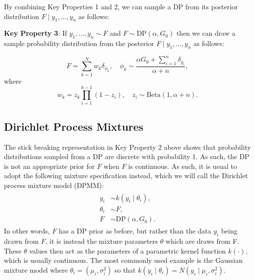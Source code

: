 \documentclass[nojss]{jss}
\begin{document}
By combining Key Properties 1 and 2, we can sample a DP from its posterior distribution $F \mid y_1,\ldots,y_n$ as follows:

\begin{tcolorbox}

\textbf{Key Property 3}:  If $y_1,\ldots,y_n \sim F$ and $F \sim \text{DP} (\alpha, G_0)$ then we can draw a sample probability distribution from the posterior $F\mid y_1,\ldots,y_n$ as follows:

$$F = \sum_{k=1}^N w_k \delta_{\phi_k}, \quad \phi_k \sim \frac{\alpha G_0 + \sum_{i=1}^n \delta_{y_i}}{\alpha+n},$$
where
$$w_k = z_k \prod_{i=1}^{k-1} (1-z_i),\quad z_i \sim \text{Beta}(1,\alpha+n).$$

\end{tcolorbox}




\subsection{Dirichlet Process Mixtures} \label{subsec:dpm}
The stick breaking representation in Key Property 2 above shows that  probability distributions sampled from a DP are discrete with probability 1. As such, the DP is not an appropriate prior for $F$ when $F$ is continuous. As such, it is usual to adopt the following mixture specification instead, which we will call the Dirichlet process mixture model (DPMM):
\begin{align}
\begin{split}
y_i &\sim k(y_i \mid \theta_i), \\
\theta_i &\sim F, \\
F &\sim \text{DP} (\alpha, G_0).
\end{split}
\label{eqn:dpmm}
\end{align}
In other words, $F$ has a DP prior as before, but rather than the data $y_i$ being drawn from $F$, it is instead the mixture parameters $\theta$ which are draws from F.  These $\theta$ values then act as the parameters of a parametric kernel function $k(\cdot)$, which is usually continuous. The most commonly used example is the Gaussian mixture model where $\theta_i = (\mu_i,\sigma^2_i)$ so that $k(y_i \mid \theta_i) = N(y_i \mid \mu_i,\sigma^2_i)$.
\end{document}
